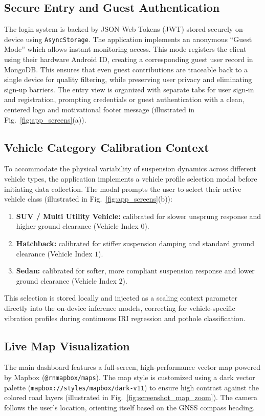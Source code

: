 \documentclass[conference]{IEEEtran}
\begin{document}
\subsection{Secure Entry and Guest Authentication}
The login system is backed by JSON Web Tokens (JWT) stored securely on-device using \texttt{AsyncStorage}. The application implements an anonymous ``Guest Mode'' which allows instant monitoring access. This mode registers the client using their hardware Android ID, creating a corresponding guest user record in MongoDB. This ensures that even guest contributions are traceable back to a single device for quality filtering, while preserving user privacy and eliminating sign-up barriers. The entry view is organized with separate tabs for user sign-in and registration, prompting credentials or guest authentication with a clean, centered logo and motivational footer message (illustrated in Fig.~\ref{fig:app_screens}(a)).

\subsection{Vehicle Category Calibration Context}
To accommodate the physical variability of suspension dynamics across different vehicle types, the application implements a vehicle profile selection modal before initiating data collection. The modal prompts the user to select their active vehicle class (illustrated in Fig.~\ref{fig:app_screens}(b)):
\begin{enumerate}
    \item \textbf{SUV / Multi Utility Vehicle:} calibrated for slower unsprung response and higher ground clearance (Vehicle Index $0$).
    \item \textbf{Hatchback:} calibrated for stiffer suspension damping and standard ground clearance (Vehicle Index $1$).
    \item \textbf{Sedan:} calibrated for softer, more compliant suspension response and lower ground clearance (Vehicle Index $2$).
\end{enumerate}
This selection is stored locally and injected as a scaling context parameter directly into the on-device inference models, correcting for vehicle-specific vibration profiles during continuous IRI regression and pothole classification.

\subsection{Live Map Visualization}
The main dashboard features a full-screen, high-performance vector map powered by Mapbox (\texttt{@rnmapbox/maps}). The map style is customized using a dark vector palette (\texttt{mapbox://styles/mapbox/dark-v11}) to ensure high contrast against the colored road layers (illustrated in Fig.~\ref{fig:screenshot_map_zoom}). The camera follows the user's location, orienting itself based on the GNSS compass heading.
\end{document}
